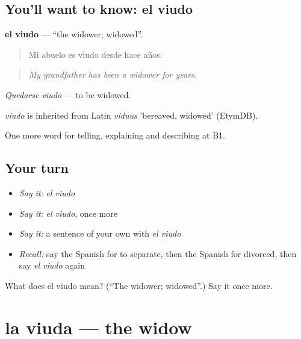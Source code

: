 \subsection*{You'll want to know: el viudo}
\textbf{el viudo} — \textquotedblleft{}the widower; widowed\textquotedblright{}.

\begin{quote}
Mi abuelo es viudo desde hace años.
\end{quote}

\begin{quote}
\emph{My grandfather has been a widower for years.}
\end{quote}

\emph{Quedarse viudo} — to be widowed.

\begin{cousinweb}
\emph{viudo} is inherited from Latin \emph{viduus} 'bereaved, widowed' (EtymDB).
\end{cousinweb}

\begin{grammarlens}[title={What you've built}]
One more word for telling, explaining and describing at B1.
\end{grammarlens}

\subsection*{Your turn}
\begin{itemize}
\raggedright
  \item \emph{Say it:} \emph{el viudo}
  \item \emph{Say it:} \emph{el viudo}, once more
  \item \emph{Say it:} a sentence of your own with \emph{el viudo}
  \item \emph{Recall:} say the Spanish for to separate, then the Spanish for divorced, then say \emph{el viudo} again
\end{itemize}

\begin{tcolorbox}[breakable,colback=teal!4,colframe=teal!35!black,title={Before you move on}]
What does el viudo mean? (\textquotedblleft{}The widower; widowed\textquotedblright{}.) Say it once more.
\end{tcolorbox}
\section[la viuda]{la viuda — the widow}

\label{lesson:ES-C550-viuda}



